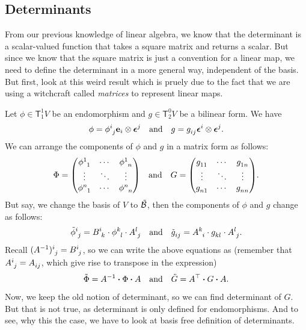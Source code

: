 \subsection{Determinants}

From our previous knowledge of linear algebra, we know that the determinant is a scalar-valued function that takes a square matrix and returns a scalar. But since we know that the square matrix is just a convention for a linear map, we need to define the determinant in a more general way, independent of the basis. But first, look at this weird result which is pruely due to the fact that we are using a witchcraft called \emph{matrices} to represent linear maps.

\begin{remark}
    Let \(\phi \in \mathsf{T}^1_1 V\) be an endomorphism and \(g \in \mathsf{T}^0_2 V\) be a bilinear form. We have
    \begin{equation}
        \phi = \tensor{\phi}{^{i}_{j}} \vb{e}_i \otimes \vb*{\epsilon}^j \quad \text{and} \quad g = \tensor{g}{_{i j}} \vb*{\epsilon}^i \otimes \vb*{\epsilon}^j.
    \end{equation}
    We can arrange the components of \(\phi\) and \(g\) in a matrix form as follows:
    \begin{equation}
        \Phi = \mqty(\tensor{\phi}{^{1}_{1}} & \cdots & \tensor{\phi}{^{1}_{n}} \\ \vdots & \ddots & \vdots \\ \tensor{\phi}{^{n}_{1}} & \cdots & \tensor{\phi}{^{n}_{n}}) \quad \text{and} \quad G = \mqty(\tensor{g}{_{1 1}} & \cdots & \tensor{g}{_{1 n}} \\ \vdots & \ddots & \vdots \\ \tensor{g}{_{n 1}} & \cdots & \tensor{g}{_{n n}}).
    \end{equation}
    But say, we change the basis of \(V\) to \(\tilde{\mathcal B}\), then the components of \(\phi\) and \(g\) change as follows:
    \begin{equation}
        \tensor{\tilde{\phi}}{^{i}_{j}} = \tensor{B}{^i_k} \cdot \tensor{\phi}{^{k}_{l}} \cdot \tensor{A}{^l_j} \quad \text{and} \quad \tensor{\tilde{g}}{_{i j}} = \tensor{A}{^k_i} \cdot \tensor{g}{_{k l}} \cdot \tensor{A}{^l_j}.
    \end{equation}
    Recall \(\tensor{(A\inv)}{^{i}_{j}} = \tensor{B}{^i_j}\), so we can write the above equations as (remember that \(\tensor{A}{^i_j} = \tensor{A}{_{i j}}\), which give rise to transpose in the expression)
    \begin{equation}
        \tilde{\Phi} = A\inv \vdot \Phi \vdot A \quad \text{and} \quad \tilde{G} = A\trans \vdot G \vdot A.
    \end{equation}
\end{remark}
Now, we keep the old notion of determinant, so we can find determinant of \(G\). But that is not true, as determinant is only defined for endomorphisms. And to see, why this the case, we have to look at basis free definition of determinants.

